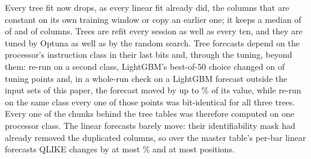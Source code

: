 Every tree fit now drops, as every linear fit
already did, the columns that are constant on its own training window or copy
an earlier one; it keeps a median of \cmKeptBase{} of \cmPNewBase{} and %
\cmKeptAll{} of \cmPNewAll{} columns. Trees
are refit every session as well as every ten, and they are
tuned by Optuna as well as by the random search. Tree forecasts
depend on the processor's instruction class in their last bits and, through
the tuning, beyond them: re-run on a second class, LightGBM's best-of-50 %
choice changed on \cmClassLgbmPick{} of \cmClassPts{} tuning points and, in a whole-run %
check on a LightGBM forecast outside the input sets of this paper, the forecast moved by up
to \cmClassMaxRelMax\% of its value, while
re-run on the same class every one of those points was bit-identical for all %
three trees. Every one of the \cmClassChunks{} chunks behind the tree %
tables was therefore computed on one processor class.
The linear
forecasts barely move: their identifiability mask had already removed the
duplicated columns, so over the master table's \cmDedupN{} per-bar linear %
forecasts QLIKE changes by at most \cmDedupQMax\% and at most \cmDedupPosMax{}
positions.

